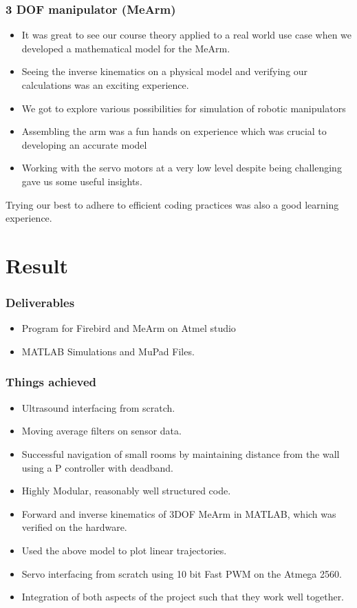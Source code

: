 \documentclass[12pt]{article}
\begin{document}
\section{3 DOF manipulator (MeArm)}

\begin{itemize}
\item It was great to see our course theory applied to a real world use case when we developed a mathematical model for the MeArm.
\item Seeing the inverse kinematics on a physical model and verifying our calculations was an exciting experience.
\item We got to explore various possibilities for simulation of robotic manipulators
\item Assembling the arm was a fun hands on experience which was crucial to developing an accurate model
\item Working with the servo motors at a very low level despite being challenging gave us some useful insights. 
\end{itemize}

\noindent Trying our best to adhere to efficient coding practices was also a good learning experience. 

\part{Result}

\section{Deliverables}

\begin{itemize}
\item Program for Firebird and MeArm on Atmel studio
\item MATLAB Simulations and MuPad Files.
\end{itemize}

\section{Things achieved}

\begin{itemize}
\item Ultrasound interfacing from scratch.
\item Moving average filters on sensor data.
\item Successful navigation of small rooms by maintaining distance from the wall using a P controller with deadband.
\item Highly Modular, reasonably well structured code.
\item Forward and inverse kinematics of 3DOF MeArm in MATLAB, which was verified on the hardware.
\item Used the above model to plot linear trajectories.
\item Servo interfacing from scratch using 10 bit Fast PWM on the Atmega 2560.
\item Integration of both aspects of the project such that they work well together.
\end{itemize}
\end{document}
